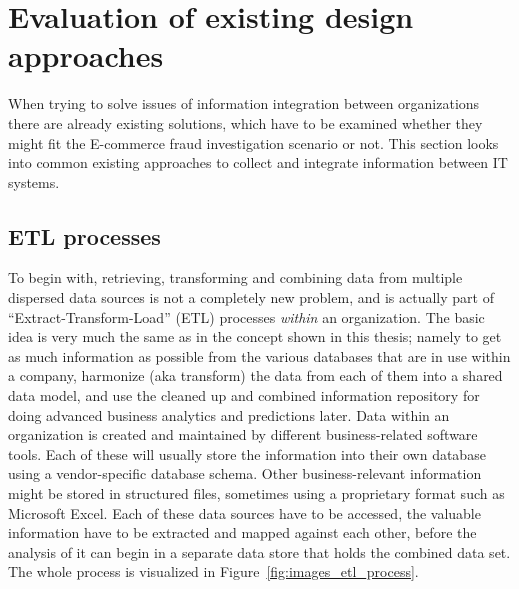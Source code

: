 
\section{Evaluation of existing design approaches}
\label{sec:system_approaches}

When trying to solve issues of information integration between organizations there are already existing solutions, which have to be examined whether they might fit the \gls{E-commerce} fraud investigation scenario or not. This section looks into common existing approaches to collect and integrate information between \gls{IT} systems.

\subsection{\gls{ETL} processes}
\label{subsec:etl_process}

To begin with, retrieving, transforming and combining data from multiple dispersed data sources is not a completely new problem, and is actually part of ``Extract-Transform-Load'' (\gls{ETL}) processes \emph{within} an organization. The basic idea is very much the same as in the concept shown in this thesis; namely to get as much information as possible from the various databases that are in use within a company, harmonize (aka transform) the data from each of them into a shared data model, and use the cleaned up and combined information repository for doing advanced business analytics and predictions later. Data within an organization is created and maintained by different business-related software tools. Each of these will usually store the information into their own database using a vendor-specific database schema. Other business-relevant information might be stored in structured files, sometimes using a proprietary format such as Microsoft Excel. Each of these data sources have to be accessed, the valuable information have to be extracted and mapped against each other, before the analysis of it can begin in a separate data store that holds the combined data set. The whole process is visualized in Figure~\ref{fig:images_etl_process}. \@

